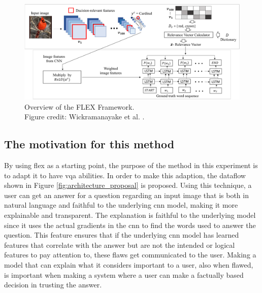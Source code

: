         \begin{figure}[htb]
            \centering
            \centerline{
            \includegraphics[width=17cm]{images/FLEX_overview.png}}
            \caption[Overview of the FLEX Framework.]{Overview of the FLEX Framework.\\
            Figure credit: Wickramanayake et al. \cite{wickramanayakeFLEXFaithfulLinguistic2019}.}
            \label{fig:flex_overview}
        \end{figure}

        \subsection{The motivation for this method}

        By using \gls{flex} as a starting point, the purpose of the method in this experiment is to adapt it to have \gls{vqa} abilities. In order to make this adaption, the dataflow shown in Figure \ref{fig:architecture_proposal} is proposed. Using this technique, a user can get an answer for a question regarding an input image that is both in natural language and faithful to the underlying \gls{cnn} model, making it more explainable and transparent. The explanation is faithful to the underlying model since it uses the actual gradients in the \gls{cnn} to find the words used to answer the question. 
        This feature ensures that if the underlying \gls{cnn} model has learned features that correlate with the answer but are not the intended or logical features to pay attention to, these flaws get communicated to the user. Making a model that can explain what it considers important to a user, also when flawed, is important when making a system where a user can make a factually based decision in trusting the answer.
        

